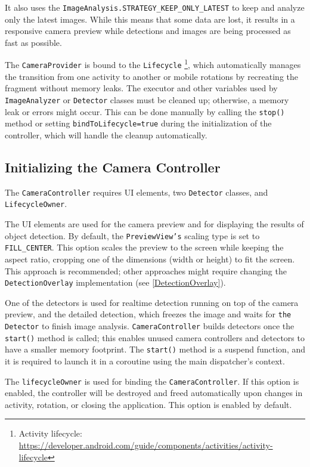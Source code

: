 It also uses the \texttt{ImageAnalysis.STRATEGY\_KEEP\_ONLY\_LATEST} to keep and analyze only the latest images. While this means that some data are lost, it results in a responsive camera preview while detections and images are being processed as fast as possible.





The \texttt{CameraProvider} is bound to the \texttt{Lifecycle} \footnote{Activity lifecycle: \url{https://developer.android.com/guide/components/activities/activity-lifecycle}}, which automatically manages the transition from one activity to another or mobile rotations by recreating the fragment without memory leaks. The executor and other variables used by \texttt{ImageAnalyzer} or \texttt{Detector} classes must be cleaned up; otherwise, a memory leak or errors might occur. This can be done manually by calling the \texttt{stop()} method or setting \texttt{bindToLifecycle=true} during the initialization of the controller, which will handle the cleanup automatically. 

\subsection{Initializing the Camera Controller}
The \texttt{CameraController} requires UI elements, two \texttt{Detector} classes, and \texttt{LifecycleOwner}. 

The UI elements are used for the camera preview and for displaying the results of object detection. By default, the \texttt{PreviewView's} scaling type is set to \texttt{FILL\_CENTER}. This option scales the preview to the screen while keeping the aspect ratio, cropping one of the dimensions (width or height) to fit the screen. This approach is recommended; other approaches might require changing the \texttt{DetectionOverlay} implementation (see \ref{DetectionOverlay}).

One of the detectors is used for realtime detection running on top of the camera preview, and the detailed detection, which freezes the image and waits for \texttt{the Detector} to finish image analysis. \texttt{CameraController} builds detectors once the \texttt{start()} method is called; this enables unused camera controllers and detectors to have a smaller memory footprint. The \texttt{start()} method is a suspend function, and it is required to launch it in a coroutine using the main dispatcher's context. 

The \texttt{lifecycleOwner} is used for binding the \texttt{CameraController}. If this option is enabled, the controller will be destroyed and freed automatically upon changes in activity, rotation, or closing the application. This option is enabled by default.

